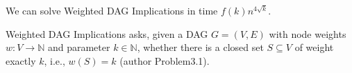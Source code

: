 \begin{statementtheorem}
We can solve Weighted DAG Implications in time $f(k)n^{4\sqrt k}$.
\end{statementtheorem}
Weighted DAG Implications asks, given a DAG $G=(V,E)$ with node weights $w:V\to\mathbb N$ and parameter $k\in\mathbb N$, whether there is a closed set $S\subseteq V$ of weight exactly $k$, i.e., $w(S)=k$ (author Problem3.1).
